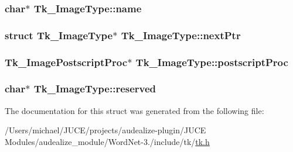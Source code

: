 \subsubsection[{\texorpdfstring{name}{name}}]{\setlength{\rightskip}{0pt plus 5cm}char$\ast$ Tk\+\_\+\+Image\+Type\+::name}\hypertarget{struct_tk___image_type_a8850ff18244023233df8c7e747cf5a88}{}\label{struct_tk___image_type_a8850ff18244023233df8c7e747cf5a88}
\subsubsection[{\texorpdfstring{next\+Ptr}{nextPtr}}]{\setlength{\rightskip}{0pt plus 5cm}struct {\bf Tk\+\_\+\+Image\+Type}$\ast$ Tk\+\_\+\+Image\+Type\+::next\+Ptr}\hypertarget{struct_tk___image_type_abcc7ba7e2104e1b86c8ec7ef05d9aa36}{}\label{struct_tk___image_type_abcc7ba7e2104e1b86c8ec7ef05d9aa36}
\subsubsection[{\texorpdfstring{postscript\+Proc}{postscriptProc}}]{\setlength{\rightskip}{0pt plus 5cm}Tk\+\_\+\+Image\+Postscript\+Proc$\ast$ Tk\+\_\+\+Image\+Type\+::postscript\+Proc}\hypertarget{struct_tk___image_type_a6fc75c13b1aa0e721ead11b18cb5f4f3}{}\label{struct_tk___image_type_a6fc75c13b1aa0e721ead11b18cb5f4f3}
\subsubsection[{\texorpdfstring{reserved}{reserved}}]{\setlength{\rightskip}{0pt plus 5cm}char$\ast$ Tk\+\_\+\+Image\+Type\+::reserved}\hypertarget{struct_tk___image_type_a358fe063076b6d9b70966e5fc500c41f}{}\label{struct_tk___image_type_a358fe063076b6d9b70966e5fc500c41f}


The documentation for this struct was generated from the following file\+:\begin{DoxyCompactItemize}
\item 
/\+Users/michael/\+J\+U\+C\+E/projects/audealize-\/plugin/\+J\+U\+C\+E Modules/audealize\+\_\+module/\+Word\+Net-\/3./include/tk/\hyperlink{tk_8h}{tk.\+h}\end{DoxyCompactItemize}
